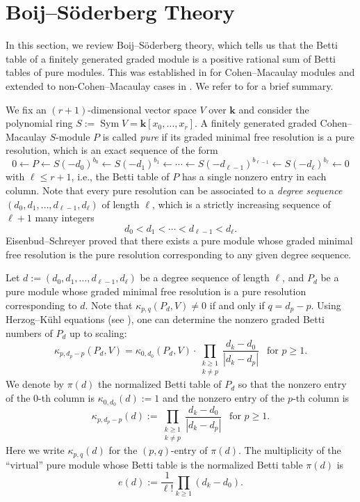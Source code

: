 \documentclass[12pt]{amsart}
\theoremstyle{definition}
\theoremstyle{remark}
\theoremstyle{corollary}
\theoremstyle{theorem}
\theoremstyle{corollary}
\theoremstyle{corollary}
\theoremstyle{definition}
\theoremstyle{remark}
\numberwithin{equation}{section}
\newcommand{\kk}{\mathbf{k}}
\def\Sym{\operatorname{Sym}}
\begin{document}
\section{Boij--S\"{o}derberg Theory}\label{sec:bs}

In this section, we review Boij--S\"{o}derberg theory, which tells us that the Betti table of a finitely generated graded module is a positive rational sum of Betti tables of pure modules. This was established in \cite{ES} for Cohen--Macaulay modules and extended to non-Cohen--Macaulay cases in \cite{BS}. We refer to \cite[Lecture 2]{EL} for a brief summary. 

\medskip

We fix an $(r+1)$-dimensional vector space $V$ over $\kk$ and consider the polynomial ring $S:=\Sym V =\kk[x_0, \ldots, x_r]$. A finitely generated graded Cohen--Macaulay $S$-module $P$ is called \emph{pure} if its graded minimal free resolution is a pure resolution, which is an exact sequence of the form
$$
0 \longleftarrow P \longleftarrow S(-d_0)^{b_0} \longleftarrow S(-d_1)^{b_1} \longleftarrow \cdots \longleftarrow S(-d_{\ell-1})^{b_{\ell-1}} \longleftarrow S(-d_{\ell})^{b_{\ell}} \longleftarrow 0
$$
with $\ell \leq r+1$, i.e., the Betti table of $P$ has a single nonzero entry in each column.
Note that every pure resolution can be associated to a \emph{degree sequence} $(d_0, d_1, \ldots, d_{\ell-1}, d_{\ell})$ of length $\ell$, which is a strictly increasing sequence of $\ell+1$ many integers 
$$
d_0 < d_1 < \cdots < d_{\ell-1} < d_{\ell}.
$$
Eisenbud--Schreyer \cite{ES} proved that there exists a pure module whose graded minimal free resolution is the pure resolution corresponding to any given degree sequence. 

\medskip

Let $d:=(d_0, d_1, \ldots, d_{\ell-1}, d_{\ell})$ be a degree sequence of length $\ell$, and $P_d$ be a pure module whose graded minimal free resolution is a pure resolution corresponding to $d$.
Note that $\kappa_{p,q}(P_d, V) \neq 0$ if and only if $q=d_p-p$. Using Herzog--K\"{u}hl equations (see \cite[Proposition 2.1.4]{EL}), one can determine the nonzero graded Betti numbers of $P_d$ up to scaling:
$$
\kappa_{p,d_p-p}(P_d, V)=\kappa_{0,d_0}(P_d, V) \cdot \prod_{\substack{k \geq 1 \\ k \neq p}} \frac{d_k-d_0}{|d_k - d_p|}~~\text{ for $p \geq 1$}.
$$
We denote by $\pi(d)$ the normalized Betti table of $P_d$ so that the nonzero entry of the $0$-th column is $\kappa_{0,d_0}(d):=1$ and the nonzero entry of the $p$-th column is 
$$
\kappa_{p,d_p-p}(d):=\prod_{\substack{k \geq 1 \\ k \neq p}} \frac{d_k-d_0}{|d_k - d_p|}~~\text{ for $p \geq 1$}.
$$
Here we write $\kappa_{p,q}(d)$ for the $(p,q)$-entry of $\pi(d)$. The multiplicity of the ``virtual'' pure module whose Betti table is the normalized Betti table $\pi(d)$ is 
$$
e(d):=\frac{1}{\ell!}  \prod_{k \geq 1} (d_k-d_0).
$$
\end{document}
